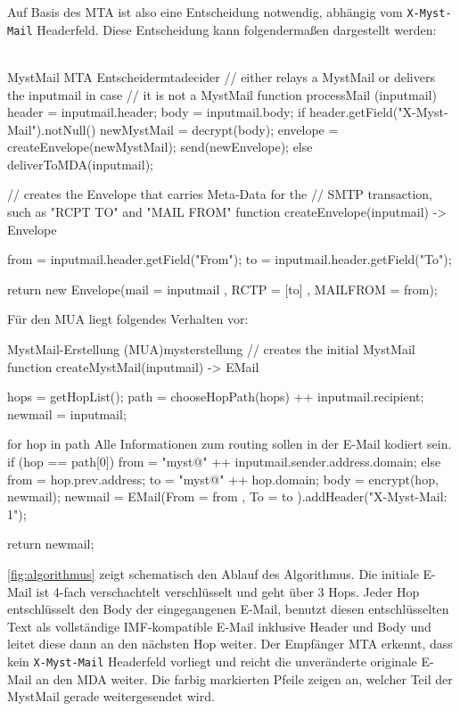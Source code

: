 Auf Basis des MTA ist also eine Entscheidung notwendig, abhängig vom \verb#X-Myst-Mail# Headerfeld. Diese Entscheidung kann folgendermaßen dargestellt werden:\\
\\
\begin{minipage}{\linewidth}
\begin{mail}{MystMail MTA Entscheider}{mtadecider}
// either relays a MystMail or delivers the inputmail in case
// it is not a MystMail
function processMail (inputmail) {
  header = inputmail.header;
  body = inputmail.body;
  if header.getField("X-Myst-Mail").notNull()
    newMystMail = decrypt(body);
    envelope = createEnvelope(newMystMail);
    send(newEnvelope);
  else
    deliverToMDA(inputmail);
}

// creates the Envelope that carries Meta-Data for the
// SMTP transaction, such as "RCPT TO" and "MAIL FROM"
function createEnvelope(inputmail) -> Envelope {
  from = inputmail.header.getField("From");
  to = inputmail.header.getField("To");
  
  return new Envelope(mail = inputmail
                     , RCTP = [to]
                     , MAILFROM = from);
}
\end{mail}
\end{minipage}

Für den MUA liegt folgendes Verhalten vor:\\

\begin{minipage}{\linewidth}
\begin{mail}{MystMail-Erstellung (MUA)}{mysterstellung}
// creates the initial MystMail
function createMystMail(inputmail) -> EMail {
  hops = getHopList();
  path = chooseHopPath(hops) ++ inputmail.recipient;
  newmail = inputmail;
  
  for hop in path {Alle Informationen zum routing sollen in der E-Mail kodiert sein.
  	if (hop == path[0])
  	  from = "myst@" ++ inputmail.sender.address.domain;
  	else  
  	  from = hop.prev.address;
  	to = "myst@" ++ hop.domain;
    body = encrypt(hop, newmail);
    newmail = EMail(From = from
                   , To = to
                   ).addHeader("X-Myst-Mail: 1");
  }

  return newmail;
}
\end{mail}
\end{minipage}


\autoref{fig:algorithmus} zeigt schematisch den Ablauf des Algorithmus. Die initiale E-Mail ist 4-fach verschachtelt verschlüsselt und geht über 3 Hops. Jeder Hop entschlüsselt den Body der eingegangenen E-Mail, benutzt diesen entschlüsselten Text als vollständige IMF-kompatible E-Mail inklusive Header und Body und leitet diese dann an den nächsten Hop weiter. Der Empfänger MTA erkennt, dass kein \verb#X-Myst-Mail# Headerfeld vorliegt und reicht die unveränderte originale E-Mail an den MDA weiter. Die farbig markierten Pfeile zeigen an, welcher Teil der MystMail gerade weitergesendet wird.

